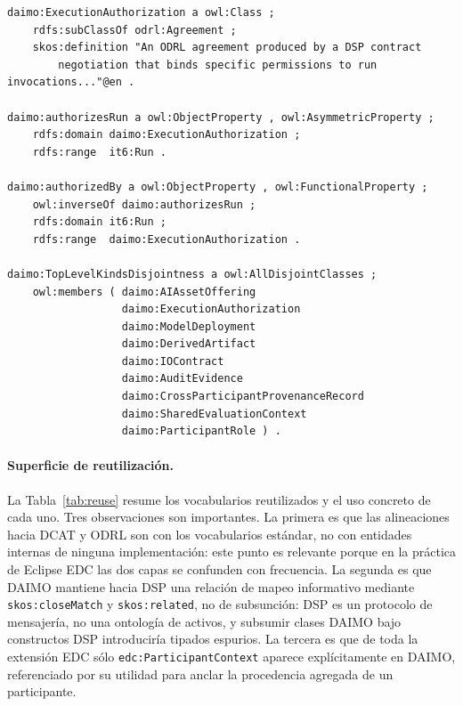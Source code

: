 \documentclass[Afour,sagev,times]{sagej}
\newcommand{\code}[1]{\texttt{#1}}
\begin{document}
\begin{lstlisting}[label=lst:axioms,caption={Axiomas centrales alrededor de \code{ExecutionAuthorization}.}]
daimo:ExecutionAuthorization a owl:Class ;
    rdfs:subClassOf odrl:Agreement ;
    skos:definition "An ODRL agreement produced by a DSP contract
        negotiation that binds specific permissions to run invocations..."@en .

daimo:authorizesRun a owl:ObjectProperty , owl:AsymmetricProperty ;
    rdfs:domain daimo:ExecutionAuthorization ;
    rdfs:range  it6:Run .

daimo:authorizedBy a owl:ObjectProperty , owl:FunctionalProperty ;
    owl:inverseOf daimo:authorizesRun ;
    rdfs:domain it6:Run ;
    rdfs:range  daimo:ExecutionAuthorization .

daimo:TopLevelKindsDisjointness a owl:AllDisjointClasses ;
    owl:members ( daimo:AIAssetOffering
                  daimo:ExecutionAuthorization
                  daimo:ModelDeployment
                  daimo:DerivedArtifact
                  daimo:IOContract
                  daimo:AuditEvidence
                  daimo:CrossParticipantProvenanceRecord
                  daimo:SharedEvaluationContext
                  daimo:ParticipantRole ) .
\end{lstlisting}

\paragraph{Superficie de reutilización.}\label{sec:reuse}

La Tabla~\ref{tab:reuse} resume los vocabularios reutilizados y el uso concreto de cada uno. Tres observaciones son importantes. La primera es que las alineaciones hacia DCAT y ODRL son con los vocabularios estándar, no con entidades internas de ninguna implementación: este punto es relevante porque en la práctica de Eclipse EDC las dos capas se confunden con frecuencia. La segunda es que DAIMO mantiene hacia DSP una relación de mapeo informativo mediante \code{skos:closeMatch} y \code{skos:related}, no de subsunción: DSP es un protocolo de mensajería, no una ontología de activos, y subsumir clases DAIMO bajo constructos DSP introduciría tipados espurios. La tercera es que de toda la extensión EDC sólo \code{edc:ParticipantContext} aparece explícitamente en DAIMO, referenciado por su utilidad para anclar la procedencia agregada de un participante.
\end{document}
